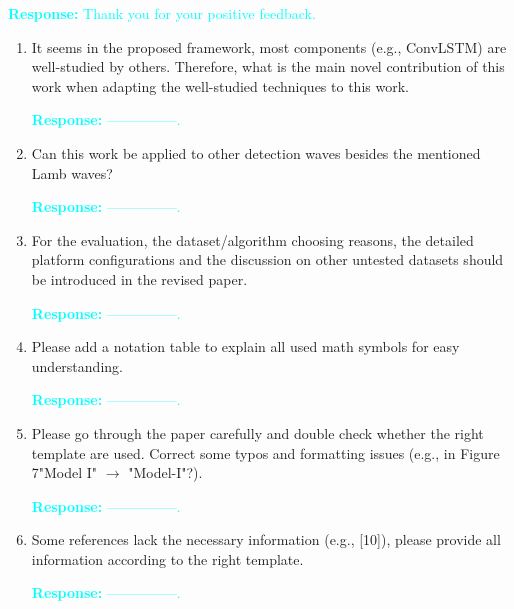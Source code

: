\documentclass[11pt,a2paper]{report}
\begin{document}
	\textcolor{Cyan}{
	\newline\textbf{Response:}
	Thank you for your positive feedback.
    }
	\begin{enumerate}
		\item It seems in the proposed framework, most components (e.g., 
		ConvLSTM) are well-studied by others. Therefore, what is the main novel 
		contribution of this work when adapting the well-studied techniques to 
		this work.
		
		\textcolor{Cyan}{
			\textbf{Response:}
		---------------.
		}
		
		\item Can this work be applied to other detection waves besides the 
		mentioned Lamb waves?
		
		\textcolor{Cyan}{
			\textbf{Response:}
			---------------.
		}
		\item For the evaluation, the dataset/algorithm choosing reasons, the 
		detailed platform configurations and the discussion on other untested 
		datasets should be introduced in the revised paper.
		
		\textcolor{Cyan}{
			\textbf{Response:}
			---------------.
		}
	
			\item Please add a notation table to explain all used math symbols 
			for easy understanding.
	
	\textcolor{Cyan}{
		\textbf{Response:}
		---------------.
	}	

			\item Please go through the paper carefully and double check 
			whether the right template are used. Correct some typos and 
			formatting issues (e.g., in Figure 7"Model I" $\to$ "Model-I"?).

    \textcolor{Cyan}{
	\textbf{Response:}
	---------------.
}

			\item Some references lack the necessary information (e.g., [10]), 
			please provide all information according to the right template.

\textcolor{Cyan}{
	\textbf{Response:}
	---------------.
}


\end{enumerate}
\end{document}
